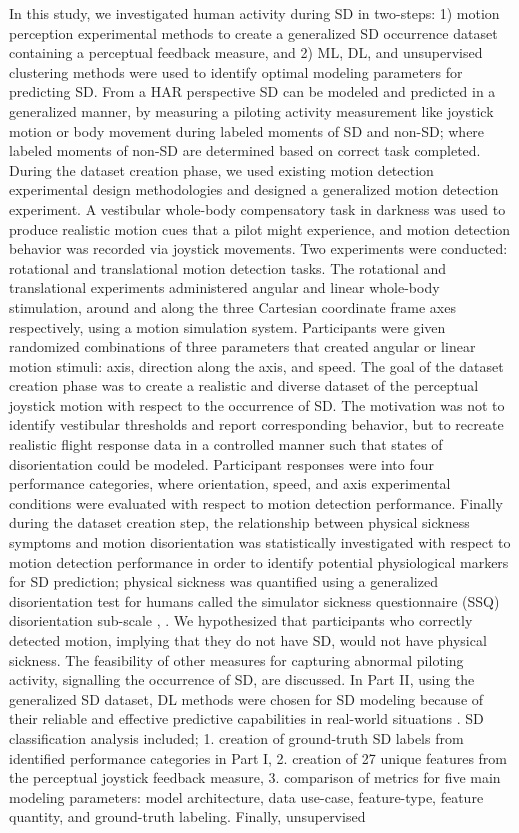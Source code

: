 \documentclass{ieeeaccess}
\begin{document}
\indent In this study, we investigated human activity during SD in two-steps: 1) motion perception experimental methods to create a generalized SD occurrence dataset containing a perceptual feedback measure, and 2) ML, DL, and unsupervised clustering methods were used to identify optimal modeling parameters for predicting SD. From a HAR perspective SD can be modeled and predicted in a generalized manner, by measuring a piloting activity measurement like joystick motion or body movement during labeled moments of SD and non-SD; where labeled moments of non-SD are determined based on correct task completed. During the dataset creation phase, we used existing motion detection experimental design methodologies and designed a generalized motion detection experiment. A vestibular whole-body compensatory task in darkness was used to produce realistic motion cues that a pilot might experience, and motion detection behavior was recorded via joystick movements. Two experiments were conducted: rotational and translational motion detection tasks. The rotational and translational experiments administered angular and linear whole-body stimulation, around and along the three Cartesian coordinate frame axes respectively, using a motion simulation system. Participants were given randomized combinations of three parameters that created angular or linear motion stimuli: axis, direction along the axis, and speed. The goal of the dataset creation phase was to create a realistic and diverse dataset of the perceptual joystick motion with respect to the occurrence of SD. The motivation was not to identify vestibular thresholds and report corresponding behavior, but to recreate realistic flight response data in a controlled manner such that states of disorientation could be modeled. Participant responses were into four performance categories, where orientation, speed, and axis experimental conditions were evaluated with respect to motion detection performance. Finally during the dataset creation step, the relationship between physical sickness symptoms and motion disorientation was statistically investigated with respect to motion detection performance in order to identify potential physiological markers for SD prediction; physical sickness was quantified using a generalized disorientation test for humans called the simulator sickness questionnaire (SSQ) disorientation sub-scale \cite{Kennedy_1993_Simulator}, \cite{Bouchard_2007_SimulatorSickness}. We hypothesized that participants who correctly detected motion, implying that they do not have SD, would not have physical sickness. The feasibility of other measures for capturing abnormal piloting activity, signalling the occurrence of SD, are discussed. In Part II, using the generalized SD dataset, DL methods were chosen for SD modeling because of their reliable and effective predictive capabilities in real-world situations \cite{Dirgova_2022_Wearable, Xiao_2003_DeepLearning}. SD classification analysis included; 1. creation of ground-truth SD labels from identified performance categories in Part I, 2. creation of 27 unique features from the perceptual joystick feedback measure, 3. comparison of metrics for five main modeling parameters: model architecture, data use-case, feature-type, feature quantity, and ground-truth labeling. Finally, unsupervised 
\end{document}
